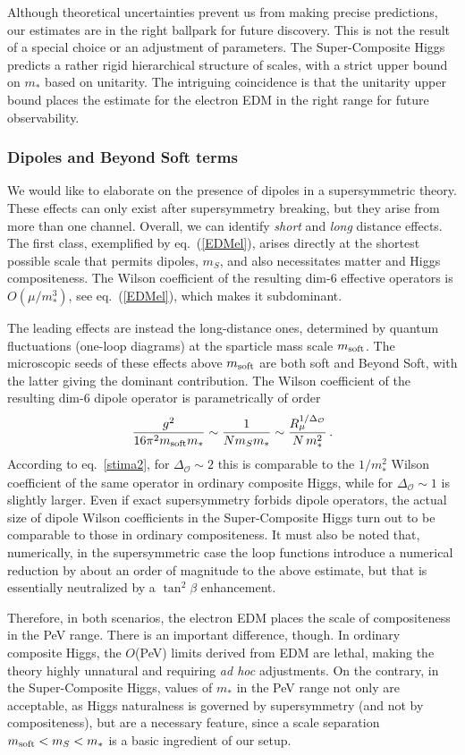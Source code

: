 \documentclass[a4paper,12pt]{article}
\newcommand{\beq}{\begin{equation}}
\newcommand{\eeq}{\end{equation}}
\def\eq#1{eq.~(\ref{#1})}
\def\eq#1{eq.~(\ref{#1})}
\def\O{\mathcal{O}}
\def\mst{m_*}
\def\mS{m_S}
\def\msoft{m_{\rm soft}}
\begin{document}
{{{{Although theoretical uncertainties prevent us from making precise predictions, our estimates are in the right ballpark for future discovery. This is not the result of a special choice or an adjustment of parameters. The Super-Composite Higgs predicts a rather rigid hierarchical structure of scales, with a strict upper bound on $\mst$ based on unitarity. The intriguing coincidence is that the unitarity upper bound places the estimate for the electron EDM in the right range for future observability. 

\subsubsection*{Dipoles and Beyond Soft terms}
We would like to elaborate  on the presence of dipoles in a supersymmetric theory. 
These effects can only exist after supersymmetry breaking, but they arise from more than one
channel. Overall, we can identify {\it {short}} and {\it {long}} distance effects. The first class, exemplified by \eq{EDMel}, arises directly at
the shortest possible scale that permits dipoles, $m_S$, and also necessitates  matter and Higgs compositeness. The Wilson coefficient of the resulting dim-6 effective operators is $O(\mu/\mst^3)$, see \eq{EDMel}, which makes it
 subdominant. 
 
 The leading effects are instead the long-distance ones, determined by quantum fluctuations (one-loop diagrams) at the sparticle mass scale $\msoft$. The microscopic seeds of these effects above $\msoft$ are both soft and Beyond Soft, with the latter giving the dominant contribution. The Wilson coefficient of the resulting  dim-6 dipole operator is parametrically of order
\beq
\frac{g^2}{16 \pi^2\msoft \mst} \sim \frac{1}{N \mS \mst} \sim \frac{R_\mu^{1/\Delta_\O}}{N\,\mst^2}\,.
\eeq
According to eq.~\eqref{stima2}, for $\Delta_\O\sim 2$ this is comparable to the $1/\mst^2$ Wilson coefficient
of the same operator in ordinary composite Higgs, while for $\Delta_\O\sim 1$ is slightly larger. Even if exact supersymmetry forbids dipole operators, the actual size of dipole Wilson coefficients in the Super-Composite Higgs turn out to be comparable to those in ordinary compositeness. It must also be noted that, numerically, in the supersymmetric case the loop functions introduce a numerical reduction by about an order of magnitude to the above estimate, but  that is essentially neutralized by a $\tan^2\beta$ enhancement. 

Therefore, in both scenarios, the electron EDM places the scale of compositeness in the PeV range.
 There is an important difference, though. In ordinary composite Higgs, the $O$(PeV) limits derived from EDM are lethal, making the theory highly unnatural and requiring {\it ad hoc} adjustments. On the contrary, in the Super-Composite Higgs, values of $\mst$ in the PeV range not only are acceptable, as Higgs naturalness is governed by supersymmetry (and not by compositeness), but are a necessary feature, since a scale separation $\msoft < \mS < \mst$ is a basic ingredient of our setup.

}}}}
\end{document}
